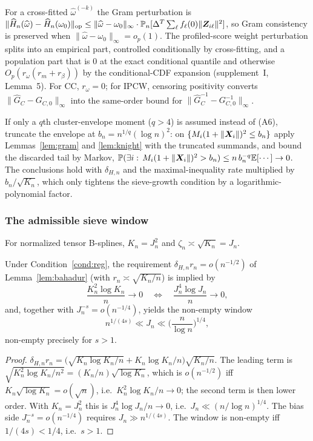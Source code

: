 \begin{remark}\label{rem:weights}
For a cross-fitted $\widehat\omega^{(-k)}$ the Gram perturbation is
$\|\widehat H_n(\widehat\omega)-\widehat H_n(\omega_0)\|_{\mathrm{op}}\le
\|\widehat\omega-\omega_0\|_\infty\cdot\mathbb{P}_n[\Delta^T\sum_\ell f_\ell(0)
\|\bm{Z}_{i\ell}\|^2]$, so Gram consistency is preserved when
$\|\widehat\omega-\omega_0\|_\infty=o_p(1)$. The profiled-score weight
perturbation splits into an empirical part, controlled conditionally by
cross-fitting, and a population part that is $0$ at the exact conditional
quantile and otherwise $O_p(r_\omega(r_m+r_\beta))$ by the conditional-CDF
expansion (supplement~I, Lemma~5). For CC, $r_\omega=0$; for IPCW, censoring
positivity converts $\|\widehat G_C-G_{C,0}\|_\infty$ into the same-order bound
for $\|\widehat G_C^{-1}-G_{C,0}^{-1}\|_\infty$.
\end{remark}

\begin{remark}\label{rem:moment}
If only a $q$th cluster-envelope moment ($q>4$) is assumed instead of (A6),
truncate the envelope at $b_n=n^{1/q}(\log n)^2$: on $\{M_i(1+\|\bm{X}_i\|)^2\le
b_n\}$ apply Lemmas~\ref{lem:gram} and \ref{lem:knight} with the truncated
summands, and bound the discarded tail by Markov, $\mathbb{P}(\exists i:\,
M_i(1+\|\bm{X}_i\|)^2>b_n)\le n\,b_n^{-q}\mathbb{E}[\cdots]\to0$. The conclusions hold with
$\delta_{H,n}$ and the maximal-inequality rate multiplied by $b_n/\sqrt{K_n}$,
which only tightens the sieve-growth condition by a logarithmic-polynomial
factor.
\end{remark}

\subsubsection{The admissible sieve window}\label{sec:window}
For normalized tensor B-splines, $K_n=J_n^2$ and $\zeta_n\asymp\sqrt{K_n}=J_n$.
\begin{proposition}\label{prop:window}
Under Condition~\ref{cond:reg}, the requirement $\delta_{H,n}r_n=o(n^{-1/2})$ of
Lemma~\ref{lem:bahadur} (with $r_n\asymp\sqrt{K_n/n}$) is implied by
\[
\frac{K_n^2\log K_n}{n}\to0\quad\Longleftrightarrow\quad
\frac{J_n^4\log J_n}{n}\to0,
\]
and, together with $J_n^{-s}=o(n^{-1/4})$, yields the non-empty window
\[
n^{1/(4s)}\ll J_n\ll\Big(\frac{n}{\log n}\Big)^{1/4},
\]
non-empty precisely for $s>1$.
\end{proposition}
\begin{proof}
$\delta_{H,n}r_n=\big(\sqrt{K_n\log K_n/n}+K_n\log K_n/n\big)\sqrt{K_n/n}$. The
leading term is $\sqrt{K_n^2\log K_n/n^2}=(K_n/n)\sqrt{\log K_n}$, which is
$o(n^{-1/2})$ iff $K_n\sqrt{\log K_n}=o(\sqrt n)$, i.e.\ $K_n^2\log K_n/n\to0$;
the second term is then lower order. With $K_n=J_n^2$ this is
$J_n^4\log J_n/n\to0$, i.e.\ $J_n\ll(n/\log n)^{1/4}$. The bias side
$J_n^{-s}=o(n^{-1/4})$ requires $J_n\gg n^{1/(4s)}$. The window is non-empty iff
$1/(4s)<1/4$, i.e.\ $s>1$.
\end{proof}

